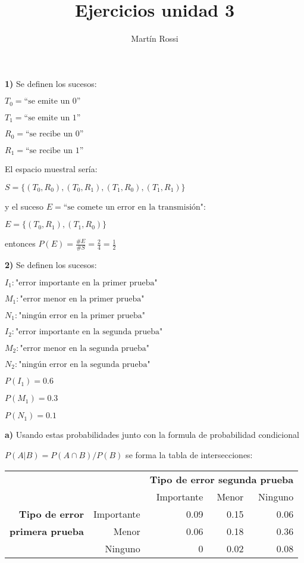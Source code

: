 \documentclass[12pt]{article}
\title{\huge{\textbf{Ejercicios unidad 3}}}
\author{Martín Rossi}
\date{}
\begin{document}
\maketitle
\textbf{1)}
Se definen los sucesos:

$T_0=\textrm{``se emite un 0''}$

$T_1=\textrm{``se emite un 1''}$

$R_0=\textrm{``se recibe un 0''}$

$R_1=\textrm{``se recibe un 1''}$

El espacio muestral sería:

$S=\{(T_0,R_0),(T_0,R_1),(T_1,R_0),(T_1,R_1)\}$

y el suceso $E=\textrm{``se comete un error en la transmisión"}$:

$E=\{(T_0,R_1),(T_1,R_0)\}$

entonces $P(E)=\frac{\#E}{\#S}=\frac{2}{4}=\frac{1}{2}$

\textbf{2)}
Se definen los sucesos:

$I_1: \textrm{"error importante en la primer prueba"}$

$M_1: \textrm{"error menor en la primer prueba"}$

$N_1: \textrm{"ningún error en la primer prueba"}$

$I_2: \textrm{"error importante en la segunda prueba"}$

$M_2: \textrm{"error menor en la segunda prueba"}$

$N_2: \textrm{"ningún error en la segunda prueba"}$

$P(I_1)=0.6$

$P(M_1)=0.3$

$P(N_1)=0.1$

\textbf{a)}
Usando estas probabilidades junto con la formula de probabilidad condicional

$P(A|B)=P(A \cap B)/P(B)$ se forma la tabla de intersecciones:\\

\begin{tabular}{r r r r r}
  &&\multicolumn{3}{l}{\textbf{Tipo de error segunda prueba}}\\
  &&Importante&Menor&Ninguno\\
  \textbf{Tipo de error}&Importante&0.09&0.15&0.06\\
  \textbf{primera prueba}&Menor&0.06&0.18&0.36\\
  &Ninguno&0&0.02&0.08\\
\end{tabular}\\
\end{document}
